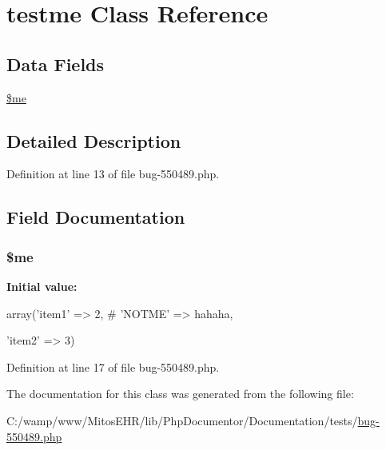 \hypertarget{classtestme}{\section{testme \-Class \-Reference}
\label{classtestme}
}
\subsection*{\-Data \-Fields}
\begin{DoxyCompactItemize}
\item 
\hyperlink{classtestme_ad856a60cee1894f180e845f9b7b81458}{\$me}
\end{DoxyCompactItemize}


\subsection{\-Detailed \-Description}


\-Definition at line 13 of file bug-\/550489.\-php.



\subsection{\-Field \-Documentation}
\hypertarget{classtestme_ad856a60cee1894f180e845f9b7b81458}{
\subsubsection[{\$me}]{\setlength{\rightskip}{0pt plus 5cm}\$me}}\label{classtestme_ad856a60cee1894f180e845f9b7b81458}
{\bfseries \-Initial value\-:}
\begin{DoxyCode}
 array('item1' => 2,
        #                                               'NOTME' => hahaha,
        
                                                        'item2' => 3)
\end{DoxyCode}


\-Definition at line 17 of file bug-\/550489.\-php.



\-The documentation for this class was generated from the following file\-:\begin{DoxyCompactItemize}
\item 
\-C\-:/wamp/www/\-Mitos\-E\-H\-R/lib/\-Php\-Documentor/\-Documentation/tests/\hyperlink{bug-550489_8php}{bug-\/550489.\-php}\end{DoxyCompactItemize}
